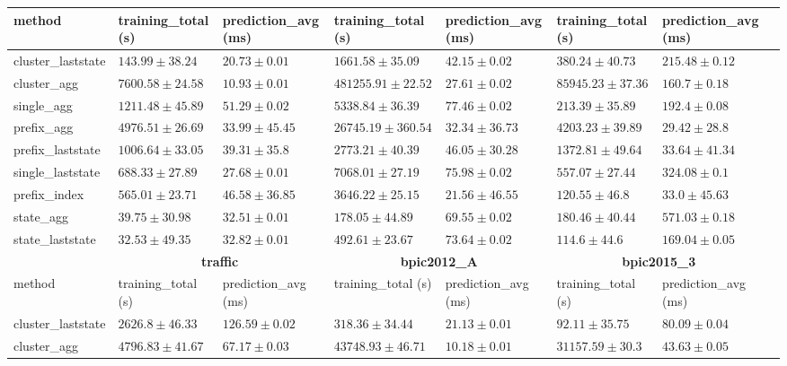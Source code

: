 \documentclass[twoside,11pt]{Latex/Classes/PhDthesisPSnPDF}
\begin{document}
\begin{table}[h]
{\begin{tabular}{llllllll}
			method  & training\_total (s) & prediction\_avg (ms) & training\_total (s) & prediction\_avg (ms) & training\_total (s) & prediction\_avg (ms) \\ \midrule
			cluster\_laststate & $143.99 \pm 38.24$ & $20.73 \pm 0.01$ & $1661.58 \pm 35.09$ & $42.15 \pm 0.02$ & $380.24 \pm 40.73$ & $215.48 \pm 0.12$ \\ 
			cluster\_agg & $7600.58 \pm 24.58$ & $\mathbf{10.93 \pm 0.01}$ & $481255.91 \pm 22.52$ & $27.61 \pm 0.02$ & $85945.23 \pm 37.36$ & $160.7 \pm 0.18$ \\ 
			single\_agg & $1211.48 \pm 45.89$ & $51.29 \pm 0.02$ & $5338.84 \pm 36.39$ & $77.46 \pm 0.02$ & $213.39 \pm 35.89$ & $192.4 \pm 0.08$ \\ 
			prefix\_agg & $4976.51 \pm 26.69$ & $33.99 \pm 45.45$ & $26745.19 \pm 360.54$ & $32.34 \pm 36.73$ & $4203.23 \pm 39.89$ & $\mathbf{29.42 \pm 28.8}$ \\ 
			prefix\_laststate & $1006.64 \pm 33.05$ & $39.31 \pm 35.8$ & $2773.21 \pm 40.39$ & $46.05 \pm 30.28$ & $1372.81 \pm 49.64$ & $33.64 \pm 41.34$ \\ 
			single\_laststate & $688.33 \pm 27.89$ & $27.68 \pm 0.01$ & $7068.01 \pm 27.19$ & $75.98 \pm 0.02$ & $557.07 \pm 27.44$ & $324.08 \pm 0.1$ \\ 
			prefix\_index & $565.01 \pm 23.71$ & $46.58 \pm 36.85$ & $3646.22 \pm 25.15$ & $\mathbf{21.56 \pm 46.55}$ & $120.55 \pm 46.8$ & $33.0 \pm 45.63$ \\ 
			state\_agg & $39.75 \pm 30.98$ & $32.51 \pm 0.01$ & $\mathbf{178.05 \pm 44.89}$ & $69.55 \pm 0.02$ & $180.46 \pm 40.44$ & $571.03 \pm 0.18$ \\ 
			state\_laststate & $\mathbf{32.53 \pm 49.35}$ & $32.82 \pm 0.01$ & $492.61 \pm 23.67$ & $73.64 \pm 0.02$ & $\mathbf{114.6 \pm 44.6}$ & $169.04 \pm 0.05$ \\ 
			\bottomrule
			\toprule
			& \multicolumn{2}{c}{{\bfseries traffic}} & \multicolumn{2}{c}{{\bfseries bpic2012\_A}} & \multicolumn{2}{c}{{\bfseries bpic2015\_3}} \\ \cmidrule(lr){2-3} \cmidrule(lr){4-5} \cmidrule(lr){6-7}
			method  & training\_total (s) & prediction\_avg (ms) & training\_total (s) & prediction\_avg (ms) & training\_total (s) & prediction\_avg (ms) \\ \midrule
			cluster\_laststate & $2626.8 \pm 46.33$ & $126.59 \pm 0.02$ & $318.36 \pm 34.44$ & $21.13 \pm 0.01$ & $92.11 \pm 35.75$ & $80.09 \pm 0.04$ \\ 
			cluster\_agg & $4796.83 \pm 41.67$ & $67.17 \pm 0.03$ & $43748.93 \pm 46.71$ & $\mathbf{10.18 \pm 0.01}$ & $31157.59 \pm 30.3$ & $43.63 \pm 0.05$ \\ 

\end{tabular}}
\end{table}
\end{document}
